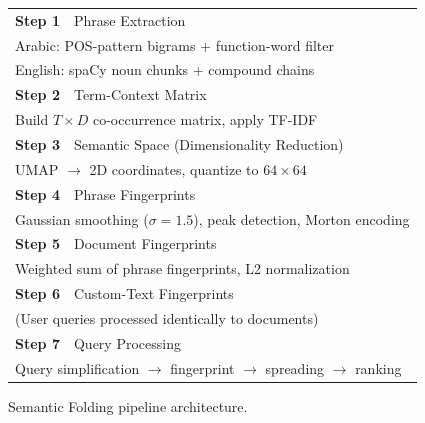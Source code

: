 \documentclass[conference]{IEEEtran}
\begin{document}
\begin{figure}[h]
  \centering
  \footnotesize
  \begin{tabular}{p{}}
    \toprule
    \textbf{Step 1}~~Phrase Extraction \\
    \quad Arabic: POS-pattern bigrams + function-word filter \\
    \quad English: spaCy noun chunks + compound chains \\
    \midrule
    \textbf{Step 2}~~Term-Context Matrix \\
    \quad Build $T \times D$ co-occurrence matrix, apply TF-IDF \\
    \midrule
    \textbf{Step 3}~~Semantic Space (Dimensionality Reduction) \\
    \quad UMAP $\rightarrow$ 2D coordinates, quantize to $64 \times 64$ \\
    \midrule
    \textbf{Step 4}~~Phrase Fingerprints \\
    \quad Gaussian smoothing ($\sigma=1.5$), peak detection, Morton encoding \\
    \midrule
    \textbf{Step 5}~~Document Fingerprints \\
    \quad Weighted sum of phrase fingerprints, L2 normalization \\
    \midrule
    \textbf{Step 6}~~Custom-Text Fingerprints \\
    \quad (User queries processed identically to documents) \\
    \midrule
    \textbf{Step 7}~~Query Processing \\
    \quad Query simplification $\rightarrow$ fingerprint $\rightarrow$
           spreading $\rightarrow$ ranking \\
    \bottomrule
  \end{tabular}
  \caption{Semantic Folding pipeline architecture.}
  \label{fig:pipeline}
\end{figure}
\end{document}
